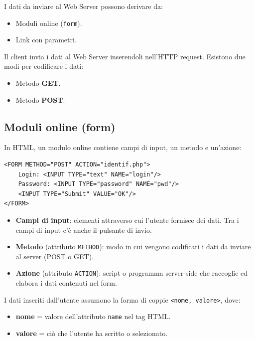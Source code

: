 I dati da inviare al Web Server possono derivare da:

\begin{itemize}
    \item Moduli online (\texttt{form}).
    \item Link con parametri.
\end{itemize}

Il client invia i dati al Web Server inserendoli nell'HTTP request. Esistono due modi per codificare i dati:

\begin{itemize}
    \item Metodo \textbf{GET}.
    \item Metodo \textbf{POST}.
\end{itemize}

\subsection{Moduli online (form)}

In HTML, un modulo online contiene campi di input, un metodo e un'azione:

\begin{lstlisting}[language=HTML5]
<FORM METHOD="POST" ACTION="identif.php">
    Login: <INPUT TYPE="text" NAME="login"/>
    Password: <INPUT TYPE="password" NAME="pwd"/>
    <INPUT TYPE="Submit" VALUE="OK"/>
</FORM>
\end{lstlisting}

\begin{itemize}
    \item \textbf{Campi di input}: elementi attraverso cui l'utente fornisce dei dati. Tra i campi di input c'è anche il pulsante di invio.
    \item \textbf{Metodo} (attributo \texttt{METHOD}): modo in cui vengono codificati i dati da inviare al server (POST o GET).
    \item \textbf{Azione} (attributo \texttt{ACTION}): script o programma server-side che raccoglie ed elabora i dati contenuti nel form.
\end{itemize}

I dati inseriti dall'utente assumono la forma di coppie \texttt{<nome, valore>}, dove:

\begin{itemize}
    \item \textbf{nome} = valore dell'attributo \texttt{name} nel tag HTML.
    \item \textbf{valore} = ciò che l'utente ha scritto o selezionato.
\end{itemize}

